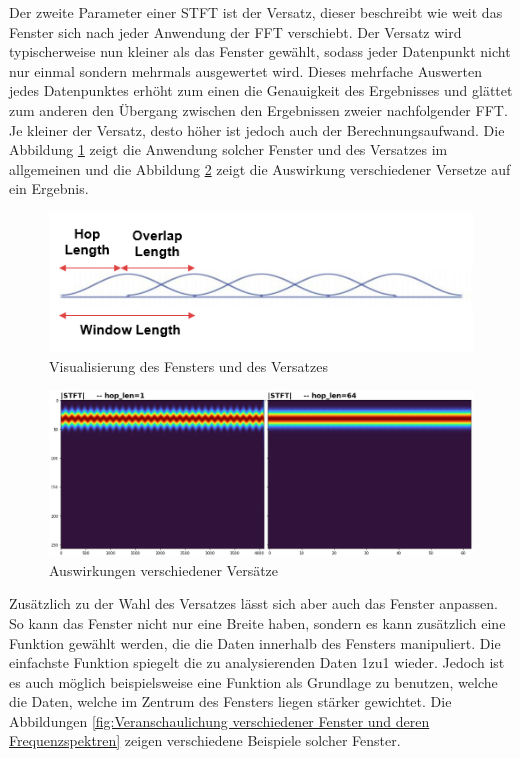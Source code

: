 Der zweite Parameter einer \ac{STFT} ist der Versatz, dieser beschreibt wie weit das Fenster sich nach jeder Anwendung der \ac{FFT} verschiebt. Der Versatz wird typischerweise nun kleiner als das Fenster gewählt, sodass jeder Datenpunkt nicht nur einmal sondern mehrmals ausgewertet wird. Dieses mehrfache Auswerten jedes Datenpunktes erhöht zum einen die Genauigkeit des Ergebnisses und glättet zum anderen den Übergang zwischen den Ergebnissen zweier nachfolgender \ac{FFT}. Je kleiner der Versatz, desto höher ist jedoch auch der Berechnungsaufwand. \cite{jacobsen2003} Die Abbildung \ref{fig:hop-overlpa-fenster} zeigt die Anwendung solcher Fenster und des Versatzes im allgemeinen und die Abbildung \ref{fig:different-overlaps} zeigt die Auswirkung verschiedener Versetze auf ein Ergebnis.
    
    \begin{figure}[H]
        \centering
        \includegraphics[width=0.5\linewidth]{images/hop-overlpa-fenster.png}
        \caption{Visualisierung des Fensters und des Versatzes \cite{hopAWindow}}
        \label{fig:hop-overlpa-fenster}
    \end{figure}
    
    \begin{figure}[H]
        \centering
        \includegraphics[width=0.5\linewidth]{images/different-overlaps.png}
        \caption{Auswirkungen verschiedener Versätze \cite{versätze}}
        \label{fig:different-overlaps}
    \end{figure}
    
Zusätzlich zu der Wahl des Versatzes lässt sich aber auch das Fenster anpassen. So kann das Fenster nicht nur eine Breite haben, sondern es kann zusätzlich eine Funktion gewählt werden, die die Daten innerhalb des Fensters manipuliert. Die einfachste Funktion spiegelt die zu analysierenden Daten 1zu1 wieder. Jedoch ist es auch möglich beispielsweise eine Funktion als Grundlage zu benutzen, welche die Daten, welche im Zentrum des Fensters liegen stärker gewichtet. Die Abbildungen \ref{fig:Veranschaulichung verschiedener Fenster und deren Frequenzspektren} zeigen verschiedene Beispiele solcher Fenster. 

